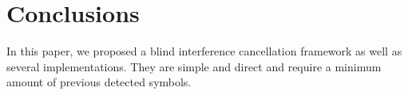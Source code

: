 \documentclass[a4paper,10pt,fleqn, twocolumn]{IEEETran}
\begin{document}
\begin{figure}
\label{BER_M_SNR}
\end{figure}
\section{Conclusions}
In this paper, we proposed a blind interference cancellation
framework as well as several implementations. They are simple and
direct and require a minimum amount of previous detected symbols.

\small

\end{document}
